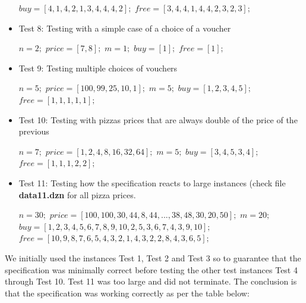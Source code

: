 \documentclass[conference]{IEEEtran}
\newcommand\tab[1][0.3cm]{\hspace*{#1}}
\begin{document}
\begin{itemize}
\begin{algorithmic}
\State $buy = [4,1,4,2,1,3,4,4,4,2];$
\State $free = [3,4,4,1,4,4,2,3,2,3];$
\\
\end{algorithmic}
\item Test 8: Testing with a simple case of a choice of a voucher
\begin{algorithmic}
\State $n = 2;$
\State $price = [7, 8];$
\State $m = 1;$
\State $buy = [1];$
\State $free = [1];$
\\
\end{algorithmic}
\item Test 9: Testing multiple choices of vouchers
\begin{algorithmic}
\State $n = 5;$
\State $price = [100, 99, 25, 10, 1];$
\State $m = 5;$
\State $buy = [1, 2, 3, 4, 5];$
\State $free = [1, 1, 1, 1, 1];$
\\
\end{algorithmic}
\item Test 10: Testing with pizzas prices that are always double of the price of the previous
\begin{algorithmic}
\State $n = 7;$
\State $price = [1, 2, 4, 8, 16, 32, 64];$
\State $m = 5;$
\State $buy = [3, 4, 5, 3, 4];$
\State $free = [1, 1, 1, 2, 2];$
\\
\end{algorithmic}
\item Test 11: Testing how the specification reacts to large instances (check file \textbf{data11.dzn} for all pizza prices.
\begin{algorithmic}
\State $n = 30;$
\State $price = [100, 100, 30, 44, 8, 44, ... ,38, 48, 30, 20, 50];$
\State $m = 20;$
\State $buy = [1, 2, 3, 4, 5, 6, 7, 8, 9, 10, 2, 5, 3, 6, 7, 4, 3, 9, 10];$
\State $free = [10, 9, 8, 7, 6, 5, 4, 3, 2, 1, 4, 3, 2, 2, 8, 4, 3, 6, 5];$
\end{algorithmic}
\end{itemize}
\tab We initially used the instances Test 1, Test 2 and Test 3 so to guarantee that the specification was minimally correct before testing the other test instances Test 4 through Test 10. Test 11 was too large and did not terminate. The conclusion is that the specification was working correctly as per the table below:
\end{document}
